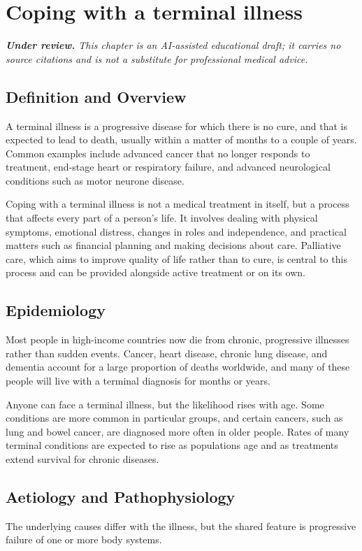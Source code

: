 \chapter{Coping with a terminal illness}

\medskip
\noindent\textit{\textbf{Under review.} This chapter is an AI-assisted educational draft; it carries no source citations and is not a substitute for professional medical advice.}

\section*{Definition and Overview}
A terminal illness is a progressive disease for which there is no cure, and that is expected to lead to death, usually within a matter of months to a couple of years. Common examples include advanced cancer that no longer responds to treatment, end-stage heart or respiratory failure, and advanced neurological conditions such as motor neurone disease.

Coping with a terminal illness is not a medical treatment in itself, but a process that affects every part of a person's life. It involves dealing with physical symptoms, emotional distress, changes in roles and independence, and practical matters such as financial planning and making decisions about care. Palliative care, which aims to improve quality of life rather than to cure, is central to this process and can be provided alongside active treatment or on its own.

\section*{Epidemiology}
Most people in high-income countries now die from chronic, progressive illnesses rather than sudden events. Cancer, heart disease, chronic lung disease, and dementia account for a large proportion of deaths worldwide, and many of these people will live with a terminal diagnosis for months or years.

Anyone can face a terminal illness, but the likelihood rises with age. Some conditions are more common in particular groups, and certain cancers, such as lung and bowel cancer, are diagnosed more often in older people. Rates of many terminal conditions are expected to rise as populations age and as treatments extend survival for chronic diseases.

\section*{Aetiology and Pathophysiology}
The underlying causes differ with the illness, but the shared feature is progressive failure of one or more body systems.

